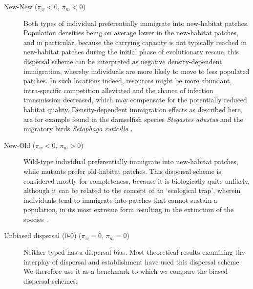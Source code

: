 \documentclass[11pt]{article}
\begin{document}
\begin{description}
	\item[New-New ($\pi_w<0$, $\pi_m<0$)]  Both types of individual preferentially immigrate into new-habitat patches. Population densities being on average lower in the new-habitat patches, and in particular, because the carrying capacity is not typically reached in new-habitat patches during the initial phase of evolutionary rescue, this dispersal scheme can be interpreted as negative density-dependent immigration, whereby individuals are more likely to move to less populated patches. In such locations indeed, resources might be more abundant, intra-specific competition alleviated and the chance of infection transmission decreased, which may compensate for the potentially reduced habitat quality.  
	Density-dependent immigration effects as described here, are for example found in the damselfish species \textit{Stegastes adustus} \citep{turgeon_2012} and the migratory birds \textit{Setophaga ruticilla} \citep{wilson_2017}. %
	
	\item[New-Old ($\pi_w<0$, $\pi_m>0$)] Wild-type individual preferentially immigrate into new-habitat patches, while mutants prefer old-habitat patches. This dispersal scheme is considered mostly for completeness, because it is biologically quite unlikely, although it can be related to the concept of an `ecological trap', wherein individuals tend to immigrate into patches that cannot sustain a population, in its most extreme form resulting in the extinction of the species \citep{battin_2004}. 
	
	\item[Unbiased dispersal (0-0) ($\pi_w=0$, $\pi_m=0$)] Neither typed has a dispersal bias. Most theoretical results examining the interplay of dispersal and establishment have used this dispersal scheme. We therefore use it as a benchmark to which we compare the biased dispersal schemes.
\end{description}
\end{document}
